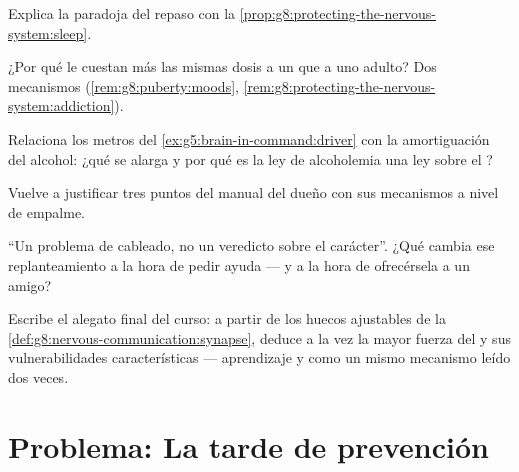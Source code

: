 \begin{exercise}[$\star\star$]\label{exo:g8:protecting-the-nervous-system:7}
Explica la paradoja del repaso con la
\cref{prop:g8:protecting-the-nervous-system:sleep}.
\end{exercise}

\begin{exercise}[$\star\star$]\label{exo:g8:protecting-the-nervous-system:8}
¿Por qué le cuestan más las mismas dosis a un   que a
uno adulto? Dos mecanismos (\cref{rem:g8:puberty:moods},
\cref{rem:g8:protecting-the-nervous-system:addiction}).
\end{exercise}

\begin{exercise}[$\star\star$]\label{exo:g8:protecting-the-nervous-system:9}
Relaciona los metros del \cref{ex:g5:brain-in-command:driver} con la
amortiguación del alcohol: ¿qué se alarga y por qué es la ley de
alcoholemia una ley sobre el ?
\end{exercise}

\begin{exercise}[$\star\star$]\label{exo:g8:protecting-the-nervous-system:10}
Vuelve a justificar tres puntos del manual del dueño con sus mecanismos
a nivel de empalme.
\end{exercise}

\begin{exercise}[$\star\star$]\label{exo:g8:protecting-the-nervous-system:11}
``Un problema de cableado, no un veredicto sobre el carácter''. ¿Qué
cambia ese replanteamiento a la hora de pedir ayuda --- y a la hora de
ofrecérsela a un amigo?
\end{exercise}

\begin{exercise}[$\star\star\star$]\label{exo:g8:protecting-the-nervous-system:12}
Escribe el alegato final del curso: a partir de los huecos ajustables
de la \cref{def:g8:nervous-communication:synapse}, deduce a la vez la
mayor fuerza del  y sus vulnerabilidades características ---
aprendizaje y  como un mismo mecanismo leído dos veces.
\end{exercise}

\section{Problema: La tarde de prevención}

